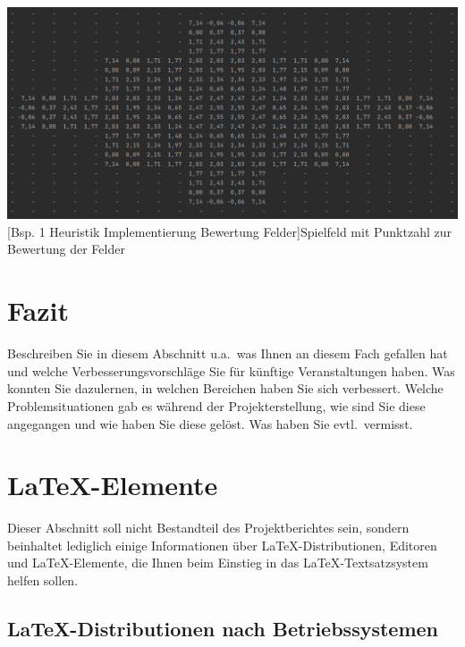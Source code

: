 \documentclass[12pt,a4paper,bibliography=totocnumbered,listof=totocnumbered]{article}
\begin{document}
\vspace{1em}
\begin{minipage}{\linewidth}
	\centering
	\includegraphics[width=0.8\linewidth]{pics/heuristics_implementation_field_values_matrix.png}
	[Bsp. 1 Heuristik Implementierung Bewertung Felder]{Spielfeld mit Punktzahl zur Bewertung der Felder}
	\label{fig:example_heuristics_implementation_field_values_matrix}
\end{minipage} 
 

\newpage
\section{Fazit}
Beschreiben Sie in diesem Abschnitt u.a.\ was Ihnen an diesem Fach gefallen hat und welche Verbesserungsvorschläge Sie für künftige Veranstaltungen haben. Was konnten Sie dazulernen, in welchen Bereichen haben Sie sich verbessert. Welche Problemsituationen gab es während der Projekterstellung, wie sind Sie diese angegangen und wie haben Sie diese gelöst. Was haben Sie evtl.\ vermisst.


\newpage
\section{\LaTeX-Elemente}
Dieser Abschnitt soll nicht Bestandteil des Projektberichtes sein, sondern beinhaltet lediglich einige Informationen über \LaTeX-Distributionen, Editoren und \LaTeX-Elemente, die Ihnen beim Einstieg in das \LaTeX-Textsatzsystem helfen sollen.

\subsection{\LaTeX-Distributionen nach Betriebssystemen}
\end{document}
